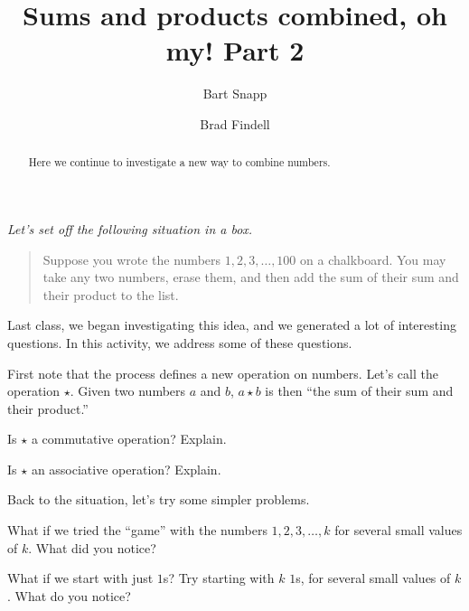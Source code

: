 \documentclass{ximera}
\title{Sums and products combined, oh my!  Part 2}
\author{Bart Snapp \and Brad Findell}
\begin{document}
\begin{abstract}
Here we continue to investigate a new way to combine numbers.
\end{abstract}
\maketitle

\emph{Let's set off the following situation in a box.} 
\begin{quote}
Suppose you wrote the numbers $1,2,3,\dots,100$ on a chalkboard. You
may take any two numbers, erase them, and then add the sum of their
sum and their product to the list.
\end{quote}
Last class, we began investigating this idea, and we generated a lot
of interesting questions.  In this activity, we address some of these
questions.

First note that the process defines a new operation on numbers.  Let's
call the operation $\star$.  Given two numbers $a$ and $b$, $a\star b$
is then ``the sum of their sum and their product.''

\begin{problem}
Is $\star$ a commutative operation?  Explain.  
\begin{freeResponse}
\end{freeResponse}
\vspace{0.5in}
\end{problem}

\begin{problem}
Is $\star$ an associative operation?  Explain.  
\begin{freeResponse}
\end{freeResponse}
\vspace{0.5in}
\end{problem}

\newpage 

Back to the situation, let's try some simpler problems.  

\begin{problem}
What if we tried the ``game'' with the numbers $1,2,3,\dots, k$ for
several small values of $k$.  What did you notice?
\begin{freeResponse}
\end{freeResponse}
\vspace{1.5in}
\end{problem}

\begin{problem}
What if we start with just $1$s?  Try starting with $k$ $1$s, for
several small values of $k$.  What do you notice?
\begin{freeResponse}
\end{freeResponse}
\vspace{1.5in}
\end{problem}
\end{document}
